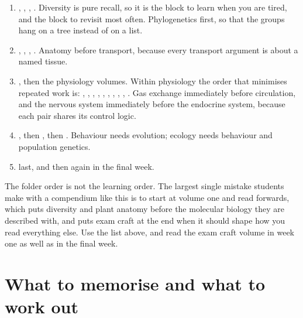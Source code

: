 \begin{keybox}[title={The dependency order for the core syllabus}]
\begin{enumerate}
      . Population genetics is the prerequisite
      for all three.
\item {}, , , . Diversity is
      pure recall, so it is the block to learn when you are tired, and the block to
      revisit most often. Phylogenetics first, so that the groups hang on a tree
      instead of on a list.
\item {}, , , . Anatomy before transport,
      because every transport argument is about a named tissue.
\item {}, then the physiology volumes. Within
      physiology the order that minimises repeated work is: , , , ,
      , , ,
      , , .
      Gas exchange immediately before circulation, and the nervous system immediately
      before the endocrine system, because each pair shares its control logic.
\item {}, then ,
      then . Behaviour needs evolution; ecology needs
      behaviour and population genetics.
\item {} last, and then again in the final week.
\end{enumerate}
\end{keybox}

\begin{warnbox}[title={TRAP: reading in folder order}]
The folder order is not the learning order. The largest single mistake students make
with a compendium like this is to start at volume one and read forwards, which puts
diversity and plant anatomy before the molecular biology they are described with, and
puts exam craft at the end when it should shape how you read everything else. Use the
list above, and read the exam craft volume in week one as well as in the final week.
\end{warnbox}

\section{What to memorise and what to work out}

